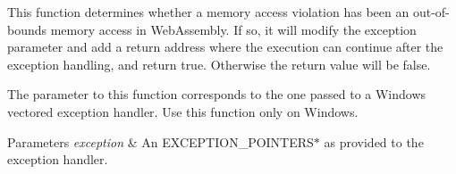 This function determines whether a memory access violation has been an out-\/of-\/bounds memory access in Web\+Assembly. If so, it will modify the exception parameter and add a return address where the execution can continue after the exception handling, and return true. Otherwise the return value will be false.

The parameter to this function corresponds to the one passed to a Windows vectored exception handler. Use this function only on Windows.


\begin{DoxyParams}{Parameters}
{\em exception} & An E\+X\+C\+E\+P\+T\+I\+O\+N\+\_\+\+P\+O\+I\+N\+T\+E\+R\+S$\ast$ as provided to the exception handler. \\
\hline
\end{DoxyParams}
